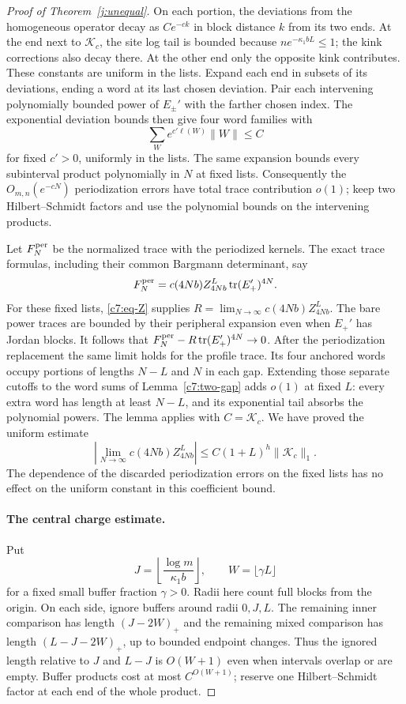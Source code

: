 \begin{proof}[Proof of Theorem~\ref{j:unequal}]
On each portion, the deviations from the homogeneous operator decay
as $Ce^{-ck}$ in block distance $k$ from its two ends. At the end next
to $\mathcal K_c$, the site log tail is bounded because
$n e^{-\kappa_1bL}\le1$; the kink corrections also decay there. At the
other end only the opposite kink contributes. These constants are
uniform in the lists. Expand each end in subsets of its deviations,
ending a word at its last chosen deviation. Pair each intervening
polynomially bounded power of $E_\pm'$ with the farther chosen index.
The exponential deviation bounds then give four word families with
\[
 \sum_W e^{c'\ell(W)}\|W\|\le C
\]
for fixed $c'>0$, uniformly in the lists. The same expansion bounds
every subinterval product polynomially in $N$ at fixed lists.
Consequently the $O_{m,n}(e^{-cN})$ periodization errors have total
trace contribution $o(1)$; keep two Hilbert--Schmidt factors and use
the polynomial bounds on the intervening products.

Let $F_N^{\rm per}$ be the normalized trace with the periodized
kernels. The exact trace formulas, including their common Bargmann
determinant, say
\[
 F_N^{\rm per}=c(4Nb)Z^L_{4Nb}\operatorname{tr}(E_+')^{4N}.
\]
For these fixed lists, \eqref{c7:eq-Z} supplies
$R=\lim_{N\to\infty}c(4Nb)Z^L_{4Nb}$. The bare power traces are bounded
by their peripheral expansion even when $E_+'$ has Jordan blocks.
It follows that $F_N^{\rm per}-R\operatorname{tr}(E_+')^{4N}\to0$.
After the periodization replacement the same limit holds for the
profile trace. Its four anchored words occupy portions of lengths
$N-L$ and $N$ in each gap. Extending those separate cutoffs to the
word sums of Lemma~\ref{c7:two-gap} adds $o(1)$ at fixed $L$: every
extra word has length at least $N-L$, and its exponential tail absorbs
the polynomial powers. The lemma applies with $C=\mathcal K_c$.
We have proved the uniform estimate
\begin{equation}\label{c7:eq-G}
 \left|\lim_{N\to\infty}c(4Nb)Z^L_{4Nb}\right|
 \le C(1+L)^h\|\mathcal K_c\|_1.
\end{equation}
The dependence of the discarded periodization errors on the fixed
lists has no effect on the uniform constant in this coefficient bound.

\paragraph{The central charge estimate.}
Put
\[
 J=\left\lfloor\frac{\log m}{\kappa_1b}\right\rfloor,
 \qquad W=\lfloor\gamma L\rfloor
\]
for a fixed small buffer fraction $\gamma>0$. Radii here count full
blocks from the origin. On each side, ignore
buffers around radii $0,J,L$. The remaining inner comparison has
length $(J-2W)_+$ and the remaining mixed comparison has length
$(L-J-2W)_+$, up to bounded endpoint changes. Thus the ignored length
relative to $J$ and $L-J$ is $O(W+1)$ even when intervals overlap or
are empty. Buffer products cost at most $C^{O(W+1)}$; reserve one
Hilbert--Schmidt factor at each end of the whole product.


\end{proof}
